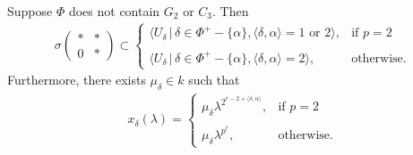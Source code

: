 \begin{lemma}\label{lem:second}
Suppose $\Phi$ does not contain $G_2$ or $C_3$. Then
\begin{align*}
\sigma\left(\begin{matrix}* & *\\0 & *\end{matrix}\right) \subset
	\left\{ \begin{array}{ll}
		\langle U_\delta \,|\, \delta \in \Phi^+ - \{\alpha\}, \langle \delta, \alpha \rangle = 1\textrm{ or }2\rangle, & \textrm{if } p = 2 \\ \\
		\langle U_\delta \,|\, \delta \in \Phi^+ - \{\alpha\}, \langle \delta, \alpha \rangle = 2 \rangle, & \textrm{otherwise}.
	\end{array}\right.
\end{align*}
Furthermore, there exists $\mu_\delta \in k$ such that
\begin{align*}
	x_\delta(\lambda) = 
	\left\{ \begin{array}{ll}
		\mu_\delta\lambda^{2^{r - 2 + \langle \delta, \alpha \rangle}}, & \textrm{if } p = 2\\ \\
		\mu_\delta\lambda^{p^r}, & \textrm{otherwise}.
	\end{array}\right.
\end{align*}
\end{lemma}
